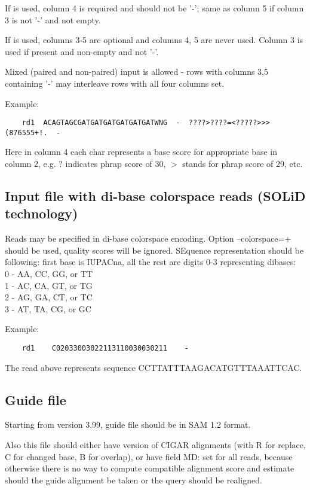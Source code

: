 \documentclass[english,letter]{article}
\begin{document}
    If  is used, column 4 is required and should not be '-'; same as column 5 
    if column 3 is not '-' and not empty.

    If  is used, columns 3-5 are optional and columns 4, 5 are never used.
    Column 3 is used if present and non-empty and not '-'.

    Mixed (paired and non-paired) input is allowed - rows with columns 3,5 
    containing '-' may interleave rows with all four columns set.

    Example:
	\begin{verbatim}
    rd1  ACAGTAGCGATGATGATGATGATGATWNG  -  ????>????=<?????>>>(876555+!.  -
	\end{verbatim}

    Here in column 4 each char represents a base score for appropriate base in
    column 2, e.g. ? indicates phrap score of 30, $>$ stands for phrap score of 
    29, etc.

\subsection{Input file with di-base colorspace reads (SOLiD technology)}

    Reads may be specified in di-base colorspace encoding.  Option --colorspace=+ 
    should be used, quality scores will be ignored.  SEquence representation should 
    be following: first base is IUPACna, all the rest are digits 0-3 representing 
    dibases: \\
    0 - AA, CC, GG, or TT\\
    1 - AC, CA, GT, or TG\\
    2 - AG, GA, CT, or TC\\
    3 - AT, TA, CG, or GC

    Example: 

	\begin{verbatim}
    rd1    C02033003022113110030030211    -
	\end{verbatim}
    
    The read above represents sequence CCTTATTTAAGACATGTTTAAATTCAC.

\subsection{Guide file}
    Starting from version 3.99, guide file should be in SAM 1.2 format. 
    
    Also this file should either have  version of CIGAR alignments
    (with R for replace, C for changed base, B for overlap), or have field MD:
    set for all reads, because otherwise there is no way to compute compatible 
    alignment score and estimate should the guide alignment be taken or the
    query should be realigned.
\end{document}
